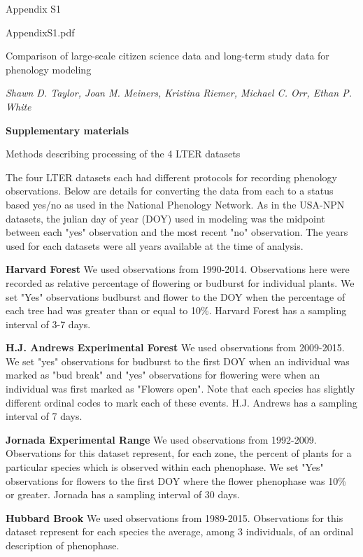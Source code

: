\documentclass[a4paper,12pt]{article}
\begin{document}
Appendix S1

AppendixS1.pdf

\Large
Comparison of large-scale citizen science data and long-term study data for phenology modeling

\normalsize
\textit{Shawn D. Taylor, Joan M. Meiners, Kristina Riemer, Michael C. Orr, Ethan P. White}

\textbf{\large Supplementary materials}

Methods describing processing of the 4 LTER datasets

The four LTER datasets each had different protocols for recording phenology observations. Below are details for converting the data from each to a status based yes/no as used in the National Phenology Network. As in the USA-NPN datasets, the julian day of year (DOY) used in modeling was the midpoint between each "yes" observation and the most recent "no" observation. The years used for each datasets were all years available at the time of analysis. 

\textbf{Harvard Forest} \newline
We used observations from 1990-2014. Observations here were recorded as relative percentage of flowering or budburst for individual plants. We set "Yes" observations budburst and flower to the DOY when the percentage of each tree had was greater than or equal to 10\%. Harvard Forest has a sampling interval of 3-7 days.

\textbf{H.J. Andrews Experimental Forest} \newline
We used observations from 2009-2015. We set "yes" observations for budburst to the first DOY when an individual was marked as "bud break" and "yes" observations for flowering were when an individual was first marked as "Flowers open". Note that each species has slightly different ordinal codes to mark each of these events. H.J. Andrews has a sampling interval of 7 days.  

\textbf{Jornada Experimental Range} \newline
We used observations from 1992-2009. Observations for this dataset represent, for each zone, the percent of plants for a particular species which is observed within each phenophase. We set "Yes" observations for flowers to the first DOY where the flower phenophase was 10\% or greater. Jornada has a sampling interval of 30 days. 

\textbf{Hubbard Brook} \newline
We used observations from 1989-2015. Observations for this dataset represent for each species the average, among 3 individuals, of an ordinal description of phenophase. \newline
\end{document}
